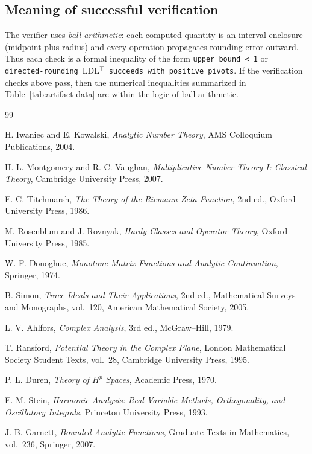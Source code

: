 \documentclass[11pt]{amsart}
\theoremstyle{definition}
\theoremstyle{remark}
\begin{document}
\subsection*{Meaning of successful verification}
The verifier uses \emph{ball arithmetic}: each computed quantity is an interval enclosure (midpoint plus radius) and every operation propagates rounding error outward.
Thus each check is a formal inequality of the form \texttt{upper bound < 1} or \texttt{directed-rounding }LDL$^\top$\texttt{ succeeds with positive pivots}.
If the verification checks above pass, then the numerical inequalities summarized in Table~\ref{tab:artifact-data} are  within the logic of ball arithmetic.

\begin{thebibliography}{99}

H. Iwaniec and E. Kowalski,
\emph{Analytic Number Theory},
AMS Colloquium Publications, 2004.

H. L. Montgomery and R. C. Vaughan,
\emph{Multiplicative Number Theory I: Classical Theory},
Cambridge University Press, 2007.

E. C. Titchmarsh,
\emph{The Theory of the Riemann Zeta-Function},
2nd ed., Oxford University Press, 1986.

M. Rosenblum and J. Rovnyak,
\emph{Hardy Classes and Operator Theory},
Oxford University Press, 1985.

W. F. Donoghue,
\emph{Monotone Matrix Functions and Analytic Continuation},
Springer, 1974.

B. Simon,
\emph{Trace Ideals and Their Applications},
2nd ed., Mathematical Surveys and Monographs, vol.~120, American Mathematical Society, 2005.

L. V. Ahlfors,
\emph{Complex Analysis},
3rd ed., McGraw--Hill, 1979.

T. Ransford,
\emph{Potential Theory in the Complex Plane},
London Mathematical Society Student Texts, vol.~28, Cambridge University Press, 1995.

P. L. Duren,
\emph{Theory of $H^p$ Spaces},
Academic Press, 1970.

E. M. Stein,
\emph{Harmonic Analysis: Real-Variable Methods, Orthogonality, and Oscillatory Integrals},
Princeton University Press, 1993.

J. B. Garnett,
\emph{Bounded Analytic Functions},
Graduate Texts in Mathematics, vol.~236, Springer, 2007.

\end{thebibliography}
\end{document}
